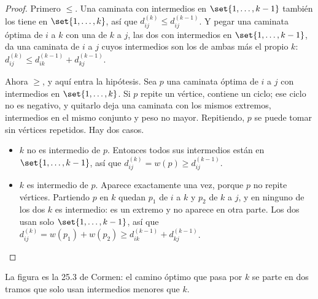 \documentclass[11pt,letterpaper]{article}
\begin{document}
\begin{proof}
  Primero $\le$. Una caminata con intermedios en
  $\set{1, \dots, k - 1}$ también los tiene en $\set{1, \dots, k}$,
  así que $d^{(k)}_{ij} \le d^{(k-1)}_{ij}$. Y pegar una caminata
  óptima de $i$ a $k$ con una de $k$ a $j$, las dos con intermedios en
  $\set{1, \dots, k - 1}$, da una caminata de $i$ a $j$ cuyos
  intermedios son los de ambas más el propio $k$:
  $d^{(k)}_{ij} \le d^{(k-1)}_{ik} + d^{(k-1)}_{kj}$.

  Ahora $\ge$, y aquí entra la hipótesis. Sea $p$ una caminata óptima
  de $i$ a $j$ con intermedios en $\set{1, \dots, k}$. Si $p$ repite
  un vértice, contiene un ciclo; ese ciclo no es negativo, y quitarlo
  deja una caminata con los mismos extremos, intermedios en el mismo
  conjunto y peso no mayor. Repitiendo, $p$ se puede tomar sin
  vértices repetidos. Hay dos casos.
  \begin{itemize}[itemsep=0.1em]
    \item $k$ no es intermedio de $p$. Entonces todos sus intermedios
          están en $\set{1, \dots, k - 1}$, así que
          $d^{(k)}_{ij} = w(p) \ge d^{(k-1)}_{ij}$.
    \item $k$ es intermedio de $p$. Aparece exactamente una vez,
          porque $p$ no repite vértices. Partiendo $p$ en $k$ quedan
          $p_1$ de $i$ a $k$ y $p_2$ de $k$ a $j$, y en ninguno de los
          dos $k$ es intermedio: es un extremo y no aparece en otra
          parte. Los dos usan solo $\set{1, \dots, k - 1}$, así que
          $d^{(k)}_{ij} = w(p_1) + w(p_2)
          \ge d^{(k-1)}_{ik} + d^{(k-1)}_{kj}$. \qedhere
  \end{itemize}
\end{proof}

La figura es la 25.3 de Cormen: el camino óptimo que pasa por $k$ se
parte en dos tramos que solo usan intermedios menores que $k$.

\begin{center}
\end{center}
\end{document}
